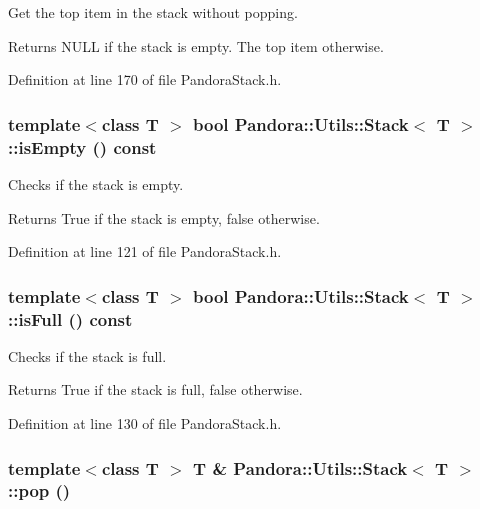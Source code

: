 Get the top item in the stack without popping. \begin{DoxyReturn}{Returns}
NULL if the stack is empty. The top item otherwise. 
\end{DoxyReturn}


Definition at line 170 of file PandoraStack.h.\hypertarget{classPandora_1_1Utils_1_1Stack_a163441b950b324b28db471e793e20c62}{
\subsubsection[{isEmpty}]{\setlength{\rightskip}{0pt plus 5cm}template$<$class T $>$ bool {\bf Pandora::Utils::Stack}$<$ T $>$::isEmpty () const}}
\label{classPandora_1_1Utils_1_1Stack_a163441b950b324b28db471e793e20c62}


Checks if the stack is empty. \begin{DoxyReturn}{Returns}
True if the stack is empty, false otherwise. 
\end{DoxyReturn}


Definition at line 121 of file PandoraStack.h.\hypertarget{classPandora_1_1Utils_1_1Stack_aceefd2e5cbc10a11bcbaa3d73cd78bbc}{
\subsubsection[{isFull}]{\setlength{\rightskip}{0pt plus 5cm}template$<$class T $>$ bool {\bf Pandora::Utils::Stack}$<$ T $>$::isFull () const}}
\label{classPandora_1_1Utils_1_1Stack_aceefd2e5cbc10a11bcbaa3d73cd78bbc}


Checks if the stack is full. \begin{DoxyReturn}{Returns}
True if the stack is full, false otherwise. 
\end{DoxyReturn}


Definition at line 130 of file PandoraStack.h.\hypertarget{classPandora_1_1Utils_1_1Stack_a2ef38d630c91e48b425799887621433f}{
\subsubsection[{pop}]{\setlength{\rightskip}{0pt plus 5cm}template$<$class T $>$ T \& {\bf Pandora::Utils::Stack}$<$ T $>$::pop ()}}
\label{classPandora_1_1Utils_1_1Stack_a2ef38d630c91e48b425799887621433f}


